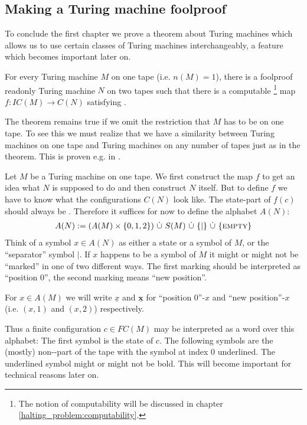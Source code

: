\subsection{Making a Turing machine foolproof}

To conclude the first chapter we prove a theorem about Turing machines which allows us to use certain classes of Turing machines interchangeably, a feature which becomes important later on.
\begin{Theorem}
	\label{turing_machines:main_theorem:theorem}
	For every Turing machine $M$ on one tape (i.e. $n(M) = 1$), there is a foolproof readonly Turing machine $N$ on two tapes such that
	there is a computable
	\footnote{The notion of computability will be discussed in chapter \ref{halting_problem:computability}.}
	map $f: IC(M) \to C(N)$
	satisfying .\footnotemark
\end{Theorem}
\begin{Remark}
	The theorem remains true if we omit the restriction that $M$ has to be on one tape. To see this we must realize that we have a similarity between Turing machines on one tape and Turing machines on any number of tapes just as in the theorem. This is proven e.g. in \cite{sip06}.
\end{Remark}
\proof
	Let $M$ be a Turing machine on one tape.
	We first construct the map $f$ to get an idea what $N$ is supposed to do and then construct $N$ itself.
	But to define $f$ we have to know what the configurations $C(N)$ look like.
	The state-part of $f(c)$ should always be \INI. Therefore it suffices for now to define the alphabet $A(N)$:
	\begin{align*}
		A(N) := (A(M) \times \{0,1,2\})~\dot\cup~S(M)~\dot\cup~\{|\}~\dot\cup~\{\text{\scshape{empty}}\}
	\end{align*}
	Think of a symbol $x \in A(N)$ as either a state or a symbol of $M$, or the ``separator'' symbol $|$.
	If $x$ happens to be a symbol of $M$ it might or might not be ``marked'' in one of two different ways.
	The first marking should be interpreted as ``position $0$'', the second marking means ``new position''.

	For $x \in A(M)$ we will write
	$\underline{x}$ and $\underline{\boldsymbol{x}}$ for ``position $0$''-$x$ and ``new position''-$x$ (i.e. $(x,1)$ and $(x,2)$) respectively.

	Thus a finite configuration $c \in FC(M)$ may be interpreted as a word over this alphabet:
	The first symbol is the state of $c$. The following symbols are the (mostly) non-\EMP-part of the tape with the symbol at index $0$ underlined.
	The underlined symbol might or might not be bold. This will become important for technical reasons later on.

